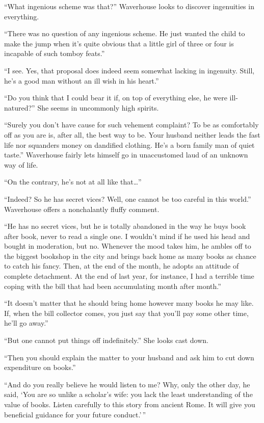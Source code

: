 \documentclass[12pt, openright]{book}
\begin{document}
``What ingenious scheme was that?'' Waverhouse looks to discover
ingenuities in everything.

``There was no question of any ingenious scheme. He just wanted the
child to make the jump when it's quite obvious that a little girl of
three or four is incapable of such tomboy feats.''

``I see. Yes, that proposal does indeed seem somewhat lacking in
ingenuity. Still, he's a good man without an ill wish in his heart.''

``Do you think that I could bear it if, on top of everything else, he
were ill-natured?'' She seems in uncommonly high spirits.

``Surely you don't have cause for such vehement complaint? To be as
comfortably off as you are is, after all, the best way to be. Your
husband neither leads the fast life nor squanders money on dandified
clothing. He's a born family man of quiet taste.'' Waverhouse fairly
lets himself go in unaccustomed laud of an unknown way of life.

``On the contrary, he's not at all like that\ldots{}''

``Indeed? So he has secret vices? Well, one cannot be too careful in
this world.'' Waverhouse offers a nonchalantly fluffy comment.

``He has no secret vices, but he is totally abandoned in the way he buys
book after book, never to read a single one. I wouldn't mind if he used
his head and bought in moderation, but no. Whenever the mood takes him,
he ambles off to the biggest bookshop in the city and brings back home
as many books as chance to catch his fancy. Then, at the end of the
month, he adopts an attitude of complete detachment. At the end of last
year, for instance, I had a terrible time coping with the bill that had
been accumulating month after month.''

``It doesn't matter that he should bring home however many books he may
like. If, when the bill collector comes, you just say that you'll pay
some other time, he'll go away.''

``But one cannot put things off indefinitely.'' She looks cast down.

``Then you should explain the matter to your husband and ask him to cut
down expenditure on books.''

``And do you really believe he would listen to me? Why, only the other
day, he said, `You are so unlike a scholar's wife: you lack the least
understanding of the value of books. Listen carefully to this story from
ancient Rome. It will give you beneficial guidance for your future
conduct.'\,''
\end{document}
